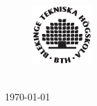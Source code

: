 \thispagestyle{empty}

\begin{figure}
	\centering
	\includegraphics[width=0.2\textwidth, keepaspectratio]{figures/bth-logo.png}
\end{figure}

\getdegree{} \\
\today

\begin{center}
	\vspace*{\fill}
	\LARGE{\textbf{\gettitle{}}}

	\LARGE{\getsubtitle{}}

	\vspace{1cm}
	\large{\textbf{\getauthor{}}}

	\blankfootnote{\getfootnote{}}
\end{center}

\vspace{4cm}
\vspace*{\fill}
\newpage

